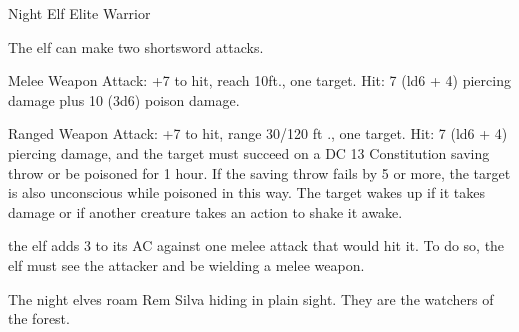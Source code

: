 \begin{monsterbox}{Night Elf Elite Warrior}
	\begin{monsteraction}[Multiattack]
		The elf can make two shortsword attacks.
	\end{monsteraction}
	\begin{monsteraction}[Shortsword]
		Melee Weapon Attack: +7 to hit, reach 10ft., one target. Hit: 7 (ld6 + 4) piercing damage plus 10 (3d6) poison damage.
	\end{monsteraction}
	\begin{monsteraction}
		Ranged Weapon Attack: +7 to hit, range 30/120 ft ., one target. Hit: 7 (ld6 + 4) piercing damage, and the target must succeed on a DC 13 Constitution saving throw or	be poisoned for 1 hour. If the saving throw fails by 5 or more,	the target is also unconscious while poisoned in this way. The target wakes up if it takes damage or if another creature takes an action to shake it awake.
	\end{monsteraction}
	\begin{monsteraction}[Parry]
		the elf adds 3 to its AC against one melee attack that would hit it. To do so, the elf must see the attacker and be
		wielding a melee weapon.
	\end{monsteraction}
		The night elves roam Rem Silva hiding in plain sight. They are the watchers of the forest. 
\end{monsterbox}

